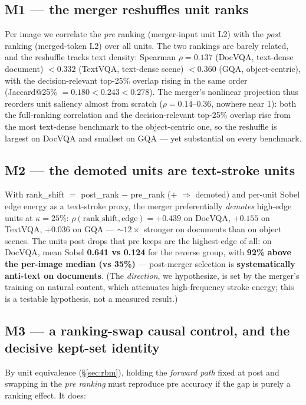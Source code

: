 \documentclass[sigconf,review,anonymous]{acmart}
\begin{document}
\subsection{M1 --- the merger reshuffles unit ranks}\label{sec:m1}

Per image we correlate the \emph{pre} ranking (merger-input unit L2) with the
\emph{post} ranking (merged-token L2) over all units. The two rankings are
barely related, and the reshuffle tracks text density: Spearman
$\rho = \mathbf{0.137}$ (DocVQA, text-dense document) $< 0.332$ (TextVQA,
text-dense scene) $< \mathbf{0.360}$ (GQA, object-centric), with the
decision-relevant top-25\% overlap rising in the same order (Jaccard@25\%
$= 0.180 < 0.243 < 0.278$). The merger's
nonlinear projection thus reorders unit saliency almost from scratch
($\rho = 0.14$--$0.36$, nowhere near 1): both the full-ranking correlation and
the decision-relevant top-25\% overlap rise from the most text-dense benchmark
to the object-centric one, so the reshuffle is largest on DocVQA and smallest on
GQA --- yet substantial on every benchmark.

\subsection{M2 --- the demoted units are text-stroke units}\label{sec:m2}

With rank\_shift $=$ post\_rank $-$ pre\_rank ($+$ $\Rightarrow$ demoted) and
per-unit Sobel edge energy as a text-stroke proxy, the merger preferentially
\emph{demotes} high-edge units at $\kappa = 25\%$: $\rho(\text{rank\_shift},
\text{edge}) = +0.439$ on DocVQA, $+0.155$ on TextVQA, $+0.036$ on GQA ---
${\sim}12\times$ stronger on documents than on object scenes. The units post
drops that pre keeps are the highest-edge of all: on DocVQA, mean Sobel
\textbf{0.641 vs 0.124} for the reverse group, with \textbf{92\% above the
per-image median (vs 35\%)} --- post-merger selection is \textbf{systematically
anti-text on documents}. (The \emph{direction}, we hypothesize, is set by the
merger's training on natural content, which attenuates high-frequency stroke
energy; this is a testable hypothesis, not a measured result.)

\subsection{M3 --- a ranking-swap causal control, and the decisive kept-set identity}\label{sec:m3}

By unit equivalence (\S\ref{sec:rbm}), holding the \emph{forward path} fixed at
post and swapping in the \emph{pre ranking} must reproduce pre accuracy if the
gap is purely a ranking effect. It does:
\end{document}

